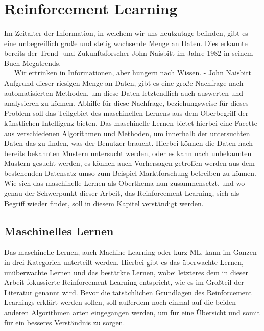\documentclass[]{iat}
\begin{document}
\chapter{Reinforcement Learning} \label{sec:reinforcement_learning}
Im Zeitalter der Information, in welchem wir uns heutzutage befinden, gibt es eine unbegreiflich große und stetig wachsende Menge an Daten. Dies erkannte bereits der Trend- und Zukunftsforscher John Naisbitt im Jahre 1982 in seinem Buch Megatrends.
\begin{align*}
    \text{Wir ertrinken in Informationen, aber hungern nach Wissen. - John Naisbitt}
\end{align*}
Aufgrund dieser riesigen Menge an Daten, gibt es eine große Nachfrage nach automatisierten Methoden, um diese Daten letztendlich auch auswerten und analysieren zu können. Abhilfe für diese Nachfrage, beziehungsweise für dieses Problem soll das Teilgebiet des maschinellen Lernens aus dem Oberbegriff der künstlichen Intelligenz bieten. Das maschinelle Lernen bietet hierbei eine Facette aus verschiedenen Algorithmen und Methoden, um innerhalb der untersuchten Daten das zu finden, was der Benutzer braucht. Hierbei können die Daten nach bereits bekannten Mustern untersucht werden, oder es kann nach unbekannten Mustern gesucht werden, es können auch Vorhersagen getroffen werden aus dem bestehenden Datensatz umso zum Beispiel Marktforschung betreiben zu können. Wie sich das maschinelle Lernen als Oberthema nun zusammensetzt, und wo genau der Schwerpunkt dieser Arbeit, das Reinforcement Learning, sich als Begriff wieder findet, soll in diesem Kapitel verständigt werden.

\section{Maschinelles Lernen} \label{sec:machine_learning}
Das maschinelle Lernen, auch Machine Learning oder kurz ML, kann im Ganzen in drei Kategorien unterteilt werden. Hierbei gibt es das überwachte Lernen, unüberwachte Lernen und das bestärkte Lernen, wobei letzteres dem in dieser Arbeit fokussierte Reinforcement Learning entspricht, wie es im Großteil der Literatur genannt wird. Bevor die tatsächlichen Grundlagen des Reinforcement Learnings erklärt werden sollen, soll außerdem noch einmal auf die beiden anderen Algorithmen arten eingegangen werden, um für eine Übersicht und somit für ein besseres Verständnis zu sorgen.
\end{document}
